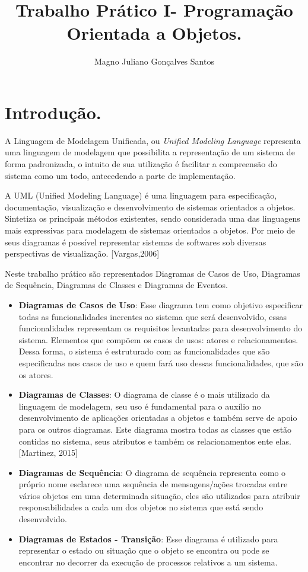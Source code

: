\documentclass[a4paper,12pt]{article}
\title{Trabalho Prático I- Programação Orientada a Objetos.}
\author{Magno Juliano Gonçalves Santos}
\begin{document}
\maketitle
\newpage
\tableofcontents

\newpage
\section{Introdução.}
A Linguagem de Modelagem Unificada, ou \textit{Unified Modeling Language} representa uma linguagem de modelagem que possibilita a representação de um sistema de forma padronizada, o intuito de sua utilização é facilitar a compreensão do sistema como um todo, antecedendo a parte de implementação. 

A UML (Unified Modeling Language) é uma linguagem para especificação,
documentação, visualização e desenvolvimento de sistemas orientados a objetos.
Sintetiza os principais métodos existentes, sendo considerada uma das linguagens mais
expressivas para modelagem de sistemas orientados a objetos. Por meio de seus
diagramas é possível representar sistemas de softwares sob diversas perspectivas de
visualização. [Vargas,2006] 

Neste trabalho prático são representados Diagramas de Casos de Uso, Diagramas de Sequência, Diagramas de Classes e Diagramas de Eventos.

\begin{itemize}
\item \textbf{Diagramas de Casos de Uso}: Esse diagrama tem como objetivo especificar todas as funcionalidades inerentes ao sistema que será desenvolvido, essas funcionalidades representam os requisitos levantadas para desenvolvimento do sistema. Elementos que compõem os casos de usos: atores e relacionamentos. Dessa forma, o sistema é estruturado com as funcionalidades que são especificadas nos casos de uso e quem fará uso dessas funcionalidades, que são os atores. 
\item \textbf{Diagramas de Classes}: O diagrama de classe é o mais utilizado da linguagem de modelagem, seu uso é fundamental para o auxílio no desenvolvimento de aplicações orientadas a objetos e também serve de apoio para os outros diagramas. Este diagrama mostra todas as classes
que estão contidas no sistema, seus atributos e também os relacionamentos ente elas. [Martinez, 2015]
\item \textbf{Diagramas de Sequência}: O diagrama de sequência representa como o próprio nome esclarece uma sequência de mensagens/ações trocadas entre vários objetos em uma determinada situação, eles são utilizados para atribuir responsabilidades a cada um dos objetos no sistema que está sendo desenvolvido.
\item \textbf{Diagramas de Estados - Transição}:
Esse diagrama é utilizado para representar o estado ou situação que o objeto se encontra ou pode se encontrar no decorrer da execução de processos relativos a um sistema. 
\end{itemize}
\end{document}
